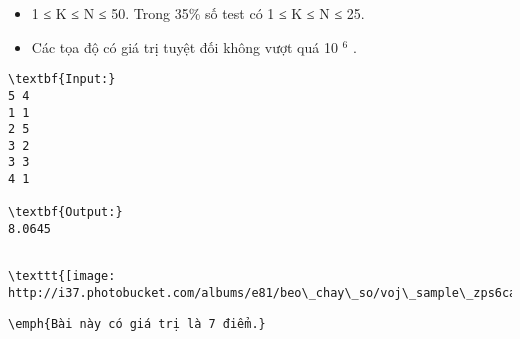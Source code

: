 \begin{itemize}
	\item 1 ≤ K ≤ N ≤ 50. Trong 35\% số test có 1 ≤ K ≤ N ≤ 25.
	\item Các tọa độ có giá trị tuyệt đối không vượt quá 10 $^ 6 $ .
\end{itemize}
\begin{verbatim}
\textbf{Input:}
5 4
1 1
2 5
3 2
3 3
4 1

\textbf{Output:}
8.0645
\end{verbatim}
\begin{verbatim}

\texttt{[image: http://i37.photobucket.com/albums/e81/beo\_chay\_so/voj\_sample\_zps6cadef14.png]}\end{verbatim}
\begin{verbatim}
\emph{Bài này có giá trị là 7 điểm.}\end{verbatim}